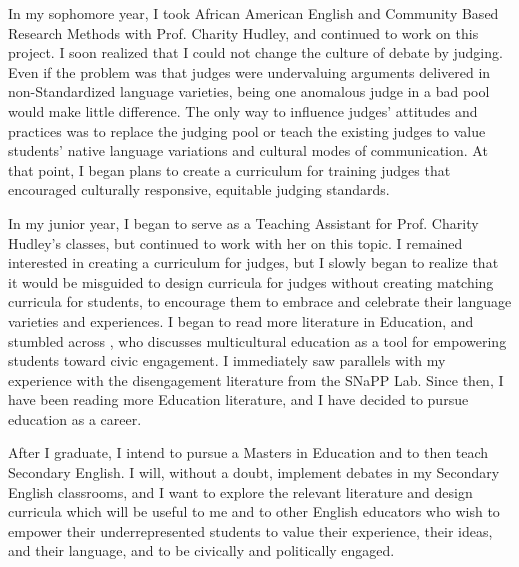 \documentclass[doc,12pt,natbib]{apa6}
\begin{document}
In my sophomore year, I took African American English and Community Based
Research Methods with Prof. Charity Hudley, and continued to work on this
project. I soon realized that I could not change the culture of debate by
judging. Even if the problem was that judges were undervaluing arguments
delivered in non-Standardized language varieties, being one anomalous judge in
a bad pool would make little difference. The only way to influence judges'
attitudes and practices was to replace the judging pool or teach the existing
judges to value students' native language variations and cultural modes of
communication. At that point, I began plans to create a curriculum for training
judges that encouraged culturally responsive, equitable judging standards.

In my junior year, I began to serve as a Teaching Assistant for Prof. Charity
Hudley's classes, but continued to work with her on this topic. I remained
interested in creating a curriculum for judges, but I slowly began to realize
that it would be misguided to design curricula for judges without creating
matching curricula for students, to encourage them to embrace and celebrate
their language varieties and experiences. I began to read more literature in
Education, and stumbled across \citet{Banks15}, who discusses multicultural
education as a tool for empowering students toward civic engagement. I
immediately saw parallels with my experience with the disengagement literature
from the SNaPP Lab. Since then, I have been reading more Education literature,
and I have decided to pursue education as a career.

After I graduate, I intend to pursue a Masters in Education and to then teach
Secondary English. I will, without a doubt, implement debates in my Secondary
English classrooms, and I want to explore the relevant literature and design
curricula which will be useful to me and to other English educators who wish to
empower their underrepresented students to value their experience, their ideas,
and their language, and to be civically and politically engaged.

\clearpage

\end{document}
